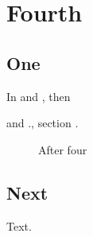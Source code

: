 \documentclass{article}
\begin{document}
\setcounter{section}{3}
\section{Fourth}
\subsection{One}
In \thesection{} and \thesubsection, then \addtocounter{subsection}{2}\thesubsection{} and
\thesection.\thesubsection, section .
\setcounter{figure}{4}
\begin{figure}[h]
\centering
\caption{After four}
\end{figure}
\subsection{Next}
Text.
\end{document}
